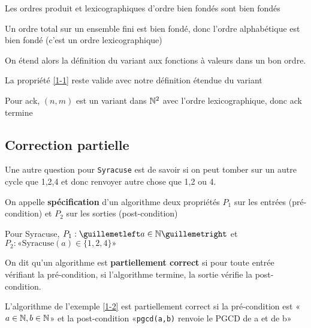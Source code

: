 \begin{proposition}
	Les ordres produit et lexicographiques d'ordre bien fondés sont bien fondés
\end{proposition}

\begin{example}
	Un ordre total sur un ensemble fini est bien fondé, donc l'ordre alphabétique est bien fondé (c'est un ordre lexicographique)
\end{example}

\begin{definition}
	On étend alors la définition du variant aux fonctions à valeurs dans un bon ordre.
\end{definition}

\begin{proposition}
	La propriété \ref{1-1} reste valide avec notre définition étendue du variant
\end{proposition}

\begin{example}
	Pour ack, $(n,m)$ est un variant dans $\mathbb{N}^2$ avec l'ordre lexicographique, donc ack termine
\end{example}

\subsection{Correction partielle}

Une autre question pour \texttt{Syracuse} est de savoir si on peut tomber sur un autre cycle que 1,2,4 et donc renvoyer autre chose que 1,2 ou 4.

\begin{definition}
	On appelle \textbf{spécification} d'un algorithme deux propriétés $P_1$ sur les entrées (pré-condition) et $P_2$ sur les sorties (post-condition)
\end{definition}

\begin{example}
	Pour Syracuse, $P_1 : «a\in \N»$ et $P_2 : «\text{Syracuse}(a) \in \{1,2,4\}»$
\end{example}

\begin{definition}
	On dit qu'un algorithme est \textbf{partiellement correct} si pour toute entrée vérifiant la pré-condition, si l'algorithme termine, la sortie vérifie la post-condition.
\end{definition}

\begin{example}
	L'algorithme de l'exemple \ref{1-2} est partiellement correct si la pré-condition est «$a\in \mathbb{N}, b \in \mathbb{N}$» et la post-condition «\texttt{pgcd(a,b)} renvoie le PGCD de a et de b» \label{1-3}
\end{example}

